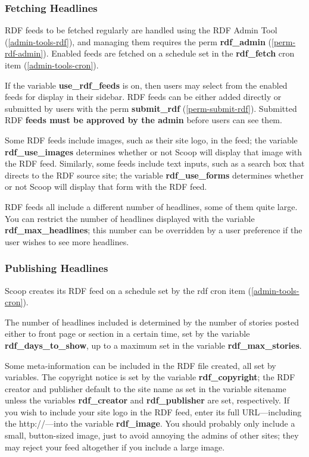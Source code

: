 \subsubsection{Fetching Headlines}
\label{rdf-fetching}

RDF feeds to be fetched regularly are handled using the RDF Admin Tool (\ref{admin-tools-rdf}), and managing them requires the perm {\bf rdf\_admin} (\ref{perm-rdf-admin}).  Enabled feeds are fetched on a schedule set in the {\bf rdf\_fetch} cron item (\ref{admin-tools-cron}).

If the variable {\bf use\_rdf\_feeds} is on, then users may select from the enabled feeds for display in their sidebar.  RDF feeds can be either added directly or submitted by users with the perm {\bf submit\_rdf} (\ref{perm-submit-rdf}).  Submitted RDF {\bf feeds must be approved by the admin} before users can see them.

Some RDF feeds include images, such as their site logo, in the feed; the variable {\bf rdf\_use\_images} determines whether or not Scoop will display that image with the RDF feed.  Similarly, some feeds include text inputs, such as a search box that directs to the RDF source site; the variable {\bf rdf\_use\_forms} determines whether or not Scoop will display that form with the RDF feed.

RDF feeds all include a different number of headlines, some of them quite large.  You can restrict the number of headlines displayed with the variable {\bf rdf\_max\_headlines}; this number can be overridden by a user preference if the user wishes to see more headlines.

\subsubsection{Publishing Headlines}
\label{rdf-publishing}

Scoop creates its RDF feed on a schedule set by the rdf cron item (\ref{admin-tools-cron}).

The number of headlines included is determined by the number of stories posted either to front page or section in a certain time, set by the variable {\bf rdf\_days\_to\_show}, up to a maximum set in the variable {\bf rdf\_max\_stories}.

Some meta-information can be included in the RDF file created, all set by variables.  The copyright notice is set by the variable {\bf rdf\_copyright}; the RDF creator and publisher default to the site name as set in the variable sitename unless the variables {\bf rdf\_creator} and {\bf rdf\_publisher} are set, respectively.  If you wish to include your site logo in the RDF feed, enter its full URL---including the http://---into the variable {\bf rdf\_image}.  You should probably only include a small, button-sized image, just to avoid annoying the admins of other sites; they may reject your feed altogether if you include a large image.

